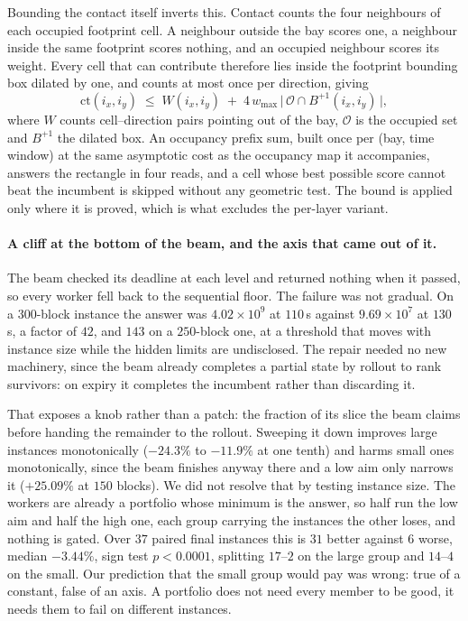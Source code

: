 \documentclass[runningheads]{llncs}
\begin{document}
Bounding the contact itself inverts this. Contact counts the four neighbours of each occupied
footprint cell. A neighbour outside the bay scores one, a neighbour inside the same footprint
scores nothing, and an occupied neighbour scores its weight. Every cell that can contribute
therefore lies inside the footprint bounding box dilated by one, and counts at most once per
direction, giving
\begin{equation}
\mathrm{ct}(i_x,i_y) \;\le\; W(i_x,i_y) \;+\; 4\,w_{\max}\,
\bigl|\,\mathcal{O} \cap B^{+1}(i_x,i_y)\,\bigr| ,
\end{equation}
where $W$ counts cell--direction pairs pointing out of the bay, $\mathcal{O}$ is the occupied set
and $B^{+1}$ the dilated box. An occupancy prefix sum, built once per (bay, time window) at the
same asymptotic cost as the occupancy map it accompanies, answers the rectangle in four reads, and
a cell whose best possible score cannot beat the incumbent is skipped without any geometric test.
The bound is applied only where it is proved, which is what excludes the per-layer variant.

\paragraph{A cliff at the bottom of the beam, and the axis that came out of it.}
The beam checked its deadline at each level and returned nothing when it passed, so every worker
fell back to the sequential floor. The failure was not gradual. On a $300$-block instance the
answer was $4.02\times10^9$ at $110$\,s against $9.69\times10^7$ at $130$\,s, a factor of $42$, and
$143$ on a $250$-block one, at a threshold that moves with instance size while the hidden limits
are undisclosed. The repair needed no new machinery, since the beam already completes a partial
state by rollout to rank survivors: on expiry it completes the incumbent rather than discarding
it.

That exposes a knob rather than a patch: the fraction of its slice the beam claims before handing
the remainder to the rollout. Sweeping it down improves large instances monotonically ($-24.3\%$ to
$-11.9\%$ at one tenth) and harms small ones monotonically, since the beam finishes anyway there
and a low aim only narrows it ($+25.09\%$ at $150$ blocks). We did not resolve that by testing
instance size. The workers are already a portfolio whose minimum is the answer, so half run the low
aim and half the high one, each group carrying the instances the other loses, and nothing is gated.
Over $37$ paired final instances this is $31$ better against $6$ worse, median $-3.44\%$, sign test
$p<0.0001$, splitting $17$--$2$ on the large group and $14$--$4$ on the small. Our prediction that
the small group would pay was wrong: true of a constant, false of an axis. A portfolio does not
need every member to be good, it needs them to fail on different instances.
\end{document}
